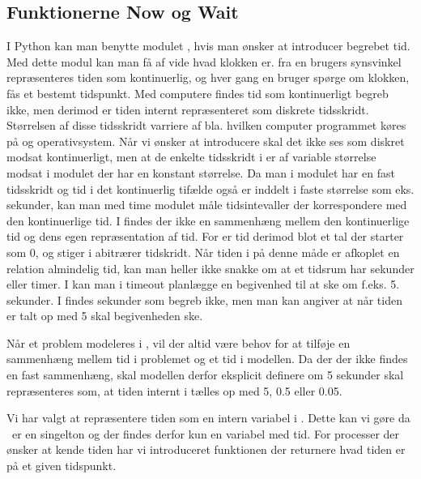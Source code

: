 \subsection{Funktionerne Now og Wait} I Python kan man benytte modulet
, hvis man ønsker at introducer begrebet tid. Med dette
modul kan man få af vide hvad klokken er. fra en brugers synsvinkel
repræsenteres tiden som kontinuerlig, og hver gang en bruger spørge
om klokken, fås et bestemt tidspunkt. Med computere findes tid som
kontinuerligt begreb ikke, men derimod er tiden internt repræsenteret
som diskrete tidsskridt. Størrelsen af disse tidsskridt varriere
af bla. hvilken computer programmet køres på og operativsystem.
Når vi ønsker at introducere \des skal det ikke ses som diskret
modsat kontinuerligt, men at de enkelte tidsskridt i \des er af
variable størrelse modsat i modulet  der har en konstant
størrelse. Da man i  modulet har en fast tidsskridt og
tid i det kontinuerlig tifælde også er inddelt i faste størrelse
som eks. sekunder, kan man med time modulet måle tidsintevaller der
korrespondere med den kontinuerlige tid. I \des findes der ikke en
sammenhæng mellem den kontinuerlige tid og dens egen repræsentation af
tid. For \des er tid derimod blot et tal der starter som 0, og stiger
i abitrærer tidskridt. Når tiden i \des på denne måde er afkoplet
en relation almindelig tid, kan man heller ikke snakke om at et tidsrum
har sekunder eller timer. I \pycsp kan man i timeout planlægge en
begivenhed til at ske om f.eks. 5. sekunder. I \des findes sekunder som
begreb ikke, men man kan angiver at når tiden er talt op med 5 skal
begivenheden ske. 

Når et problem modeleres i \des, vil der altid være behov for at
tilføje en sammenhæng mellem tid i problemet og et tid i modellen. Da
der der ikke findes en fast sammenhæng, skal modellen derfor eksplicit
definere om 5 sekunder skal repræsenteres som, at tiden internt i
\pycsp tælles op med 5, 0.5 eller 0.05.

Vi har valgt at repræsentere tiden som en intern variabel i \sched.
Dette kan vi gøre da \sched ~er en singelton og der findes derfor kun
en variabel med tid. For processer der ønsker at kende tiden har vi
introduceret funktionen  der returnere hvad tiden er på et
given tidspunkt.




